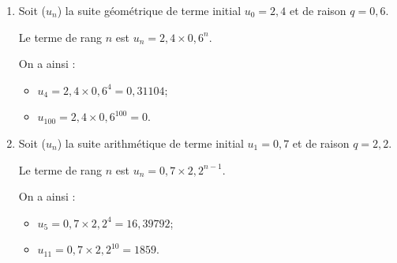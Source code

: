 \begin{myexs}
	\begin{enumerate}
		\item 	Soit ($u_n$) la suite géométrique de terme initial $u_0 = 2,4$ et de raison $q = 0,6$.
		
		Le terme de rang $n$ est $u_n = 2,4 \times 0,6^n$.
		
		On a ainsi : 
		\begin{itemize}
			\item $u_4 = 2,4 \times 0,6^4 = 0,31104$;
			\item $u_{100} = 2,4 \times 0,6^{100} = 0$.
		\end{itemize}
		
		\item Soit ($u_n$) la suite arithmétique de terme initial $u_1 = 0,7$ et de raison $q = 2,2$.
		
		Le terme de rang $n$ est $u_n = 0,7 \times 2,2^{n-1}$.
		
		On a ainsi : 
		\begin{itemize}
			\item $u_5 = 0,7 \times 2,2^{4}= 16,39792$;
			\item $u_11 = 0,7 \times 2,2^{10} = 1859$.
		\end{itemize}
	\end{enumerate}
	
	
	
\end{myexs}